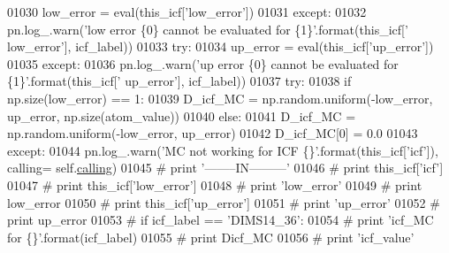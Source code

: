 \begin{DoxyCode}
01030                                 low\_error = eval(this\_icf[\textcolor{stringliteral}{'low\_error'}])
01031                             \textcolor{keywordflow}{except}:
01032                                 pn.log\_.warn(\textcolor{stringliteral}{'low error \{0\} cannot be evaluated for \{1\}'}.format(this\_icf[\textcolor{stringliteral}{'
      low\_error'}], icf\_label))
01033                             \textcolor{keywordflow}{try}:
01034                                 up\_error = eval(this\_icf[\textcolor{stringliteral}{'up\_error'}])
01035                             \textcolor{keywordflow}{except}:
01036                                 pn.log\_.warn(\textcolor{stringliteral}{'up error \{0\} cannot be evaluated for \{1\}'}.format(this\_icf[\textcolor{stringliteral}{'
      up\_error'}], icf\_label))
01037                             \textcolor{keywordflow}{try}:
01038                                 \textcolor{keywordflow}{if} np.size(low\_error) == 1:
01039                                     D\_icf\_MC = np.random.uniform(-low\_error, up\_error, np.size(atom\_value))
01040                                 \textcolor{keywordflow}{else}:
01041                                     D\_icf\_MC = np.random.uniform(-low\_error, up\_error)
01042                                 D\_icf\_MC[0] = 0.0
01043                             \textcolor{keywordflow}{except}:
01044                                 pn.log\_.warn(\textcolor{stringliteral}{'MC not working for ICF \{\}'}.format(this\_icf[\textcolor{stringliteral}{'icf'}]), calling=
      self.\hyperlink{classpyneb_1_1core_1_1icf_1_1_i_c_f_aaeb9b3827ef557a32b109baef31da77f}{calling})
01045 \textcolor{comment}{#                             print '--------IN---------'}
01046 \textcolor{comment}{#                             print this\_icf['icf']}
01047 \textcolor{comment}{#                             print this\_icf['low\_error']}
01048 \textcolor{comment}{#                             print 'low\_error'}
01049 \textcolor{comment}{#                             print low\_error}
01050 \textcolor{comment}{#                             print this\_icf['up\_error']}
01051 \textcolor{comment}{#                             print 'up\_error'}
01052 \textcolor{comment}{#                             print up\_error}
01053 \textcolor{comment}{#                             if icf\_label == 'DIMS14\_36':}
01054 \textcolor{comment}{#                                 print 'icf\_MC for \{\}'.format(icf\_label)}
01055 \textcolor{comment}{#                                 print Dicf\_MC}
01056 \textcolor{comment}{#                                 print 'icf\_value'                            }

\end{DoxyCode}
